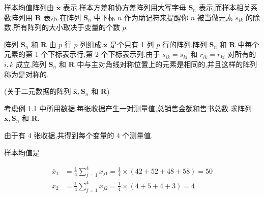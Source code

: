 样本均值阵列由 $\bar{\bm{x}}$ 表示.样本方差和协方差阵列用大写字母 $\bm{S}_n$ 表示,而样本相关系数阵列用 $\bm{R}$ 表示.在阵列 $\bm{S}_n$ 中下标 $n$ 作为助记符来提醒你 $n$ 被当做元素 $s_{ik}$ 的除数.所有阵列的大小取决于变量的个数 $p$.

阵列 $\bm{S}_n$ 和 $\bm{R}$ 由 $p$ 行 $p$ 列组成.$\bar{\bm{x}}$ 是个只有 1 列 $p$ 行的阵列.阵列 $\bm{S}_n$ 和 $\bm{R}$ 中每个元素的第 1 个下标表示行,第 2 个下标表示列.由于 $s_{ik}=s_{ki}$ 和 $r_{ik}=r_{ki}$ 对所有的 $i,k$ 成立,阵列 $\bm{S}_n$ 和 $\bm{R}$ 中与主对角线对称位置上的元素是相同的,并且这样的阵列称为是对称的.

 (关于二元数据的阵列 $\bar{\bm{x}},\bm{S}_n$ 和 $\bm{R}$)

考虑例 1.1 中所用数据.每张收据产生一对测量值,总销售金额和售书总数.求阵列 $\bar{\bm{x}},\bm{S}_n$ 和 $\bm{R}$.

由于有 4 张收据,共得到每个变量的 4 个测量值.

样本均值是

\begin{align*}
\bar{x}_1 &= \frac{1}{4}\sum_{j=1}^{4}x_{j1} = \frac{1}{4}\times(42+52+48+58) = 50 \\
\bar{x}_2 &= \frac{1}{4}\sum_{j=1}^{4}x_{j2} = \frac{1}{4}\times(4+5+4+3) = 4
\end{align*}

